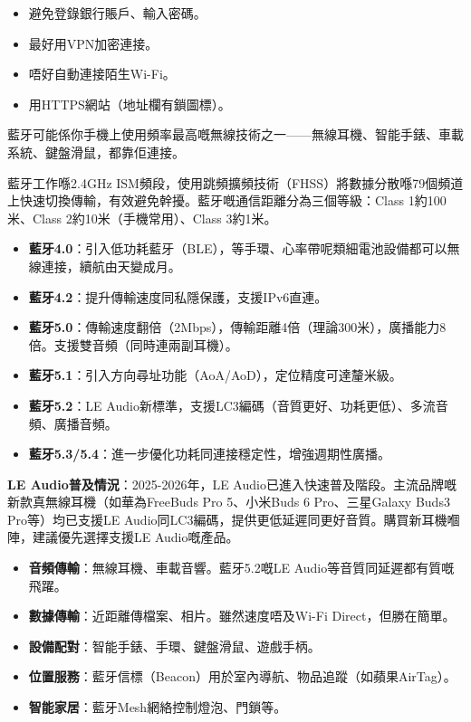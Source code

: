 \begin{itemize}
  \item 避免登錄銀行賬戶、輸入密碼。
  \item 最好用VPN加密連接。
  \item 唔好自動連接陌生Wi-Fi。
  \item 用HTTPS網站（地址欄有鎖圖標）。
\end{itemize}


藍牙可能係你手機上使用頻率最高嘅無線技術之一——無線耳機、智能手錶、車載系統、鍵盤滑鼠，都靠佢連接。


藍牙工作喺2.4GHz ISM頻段，使用跳頻擴頻技術（FHSS）將數據分散喺79個頻道上快速切換傳輸，有效避免幹擾。藍牙嘅通信距離分為三個等級：Class 1約100米、Class 2約10米（手機常用）、Class 3約1米。


\begin{itemize}
  \item \textbf{藍牙4.0}：引入低功耗藍牙（BLE），等手環、心率帶呢類細電池設備都可以無線連接，續航由天變成月。
  \item \textbf{藍牙4.2}：提升傳輸速度同私隱保護，支援IPv6直連。
  \item \textbf{藍牙5.0}：傳輸速度翻倍（2Mbps），傳輸距離4倍（理論300米），廣播能力8倍。支援雙音頻（同時連兩副耳機）。
  \item \textbf{藍牙5.1}：引入方向尋址功能（AoA/AoD），定位精度可達釐米級。
  \item \textbf{藍牙5.2}：LE Audio新標準，支援LC3編碼（音質更好、功耗更低）、多流音頻、廣播音頻。
  \item \textbf{藍牙5.3/5.4}：進一步優化功耗同連接穩定性，增強週期性廣播。
\end{itemize}

\textbf{LE Audio普及情況}：2025-2026年，LE Audio已進入快速普及階段。主流品牌嘅新款真無線耳機（如華為FreeBuds Pro 5、小米Buds 6 Pro、三星Galaxy Buds3 Pro等）均已支援LE Audio同LC3編碼，提供更低延遲同更好音質。購買新耳機嗰陣，建議優先選擇支援LE Audio嘅產品。


\begin{itemize}
  \item \textbf{音頻傳輸}：無線耳機、車載音響。藍牙5.2嘅LE Audio等音質同延遲都有質嘅飛躍。
  \item \textbf{數據傳輸}：近距離傳檔案、相片。雖然速度唔及Wi-Fi Direct，但勝在簡單。
  \item \textbf{設備配對}：智能手錶、手環、鍵盤滑鼠、遊戲手柄。
  \item \textbf{位置服務}：藍牙信標（Beacon）用於室內導航、物品追蹤（如蘋果AirTag）。
  \item \textbf{智能家居}：藍牙Mesh網絡控制燈泡、門鎖等。
\end{itemize}

